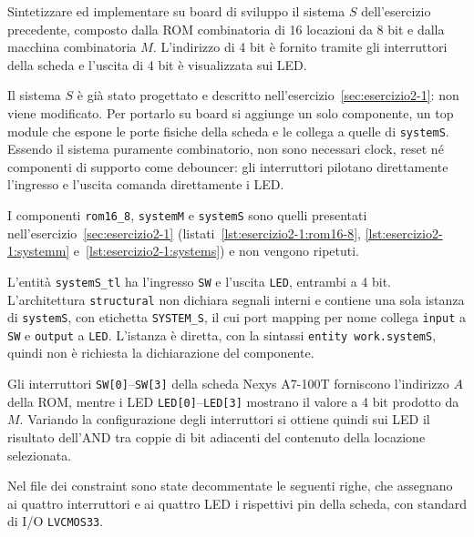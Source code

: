 \label{sec:esercizio2-2}

\begin{traccia}
Sintetizzare ed implementare su board di sviluppo il sistema $S$ dell'esercizio precedente, composto dalla ROM combinatoria di 16 locazioni da 8 bit e dalla macchina combinatoria $M$. L'indirizzo di 4 bit è fornito tramite gli interruttori della scheda e l'uscita di 4 bit è visualizzata sui LED.
\end{traccia}

\progetto

Il sistema $S$ è già stato progettato e descritto nell'esercizio~\ref{sec:esercizio2-1}: non viene modificato. Per portarlo su board si aggiunge un solo componente, un top module che espone le porte fisiche della scheda e le collega a quelle di \texttt{systemS}. Essendo il sistema puramente combinatorio, non sono necessari clock, reset né componenti di supporto come debouncer: gli interruttori pilotano direttamente l'ingresso e l'uscita comanda direttamente i LED.

\implementazione

I componenti \texttt{rom16\_8}, \texttt{systemM} e \texttt{systemS} sono quelli presentati nell'esercizio~\ref{sec:esercizio2-1} (listati~\ref{lst:esercizio2-1:rom16-8}, \ref{lst:esercizio2-1:systemm} e~\ref{lst:esercizio2-1:systems}) e non vengono ripetuti.

L'entità \texttt{systemS\_tl} ha l'ingresso \texttt{SW} e l'uscita \texttt{LED}, entrambi a 4 bit. L'architettura \texttt{structural} non dichiara segnali interni e contiene una sola istanza di \texttt{systemS}, con etichetta \texttt{SYSTEM\_S}, il cui port mapping per nome collega \texttt{input} a \texttt{SW} e \texttt{output} a \texttt{LED}. L'istanza è diretta, con la sintassi \texttt{entity work.systemS}, quindi non è richiesta la dichiarazione del componente.


\sintesiboard

Gli interruttori \texttt{SW[0]}--\texttt{SW[3]} della scheda Nexys A7-100T forniscono l'indirizzo $A$ della ROM, mentre i LED \texttt{LED[0]}--\texttt{LED[3]} mostrano il valore a 4 bit prodotto da $M$. Variando la configurazione degli interruttori si ottiene quindi sui LED il risultato dell'AND tra coppie di bit adiacenti del contenuto della locazione selezionata.


Nel file dei constraint sono state decommentate le seguenti righe, che assegnano ai quattro interruttori e ai quattro LED i rispettivi pin della scheda, con standard di I/O \texttt{LVCMOS33}.

